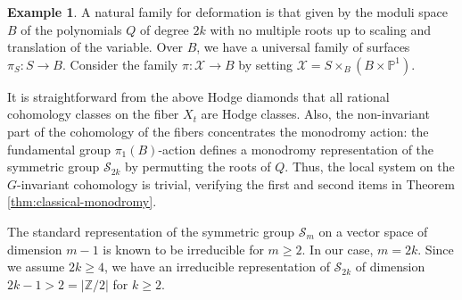 \documentclass[12pt,a4paper]{amsart}
\theoremstyle{definition}
\newtheorem{example}[theorem]{Example}
\theoremstyle{remark}
\newcommand{\Z}{\mathbb{Z}}
\begin{document}
\begin{example}
A natural family for deformation is that given by the moduli space $B$ of the polynomials $Q$ of degree $2k$ with no multiple roots up to scaling and translation of the variable. Over $B$, we have a universal family of surfaces $\pi_S: S\to B$. Consider the family $\pi: \mathcal X \to B$ by setting $\mathcal{X} = S \times_B (B \times \mathbb P^1)$.

It is straightforward from the above Hodge diamonds that all rational cohomology classes on the fiber $X_t$ are Hodge classes. Also, the non-invariant part of the cohomology of the fibers concentrates the monodromy action: the fundamental group $\pi_1(B)$-action defines a monodromy representation of the symmetric group $\mathcal S_{2k}$ by permutting the roots of $Q$. Thus, the local system on the $G$-invariant cohomology is trivial, verifying the first and second items in Theorem \ref{thm:classical-monodromy}.

 The standard representation of the symmetric group $\mathcal S_m$ on a vector space of dimension $m-1$ is known to be irreducible for $m \ge 2$. In our case, $m=2k$. Since we assume $2k \ge 4$, we have an irreducible representation of $\mathcal S_{2k}$ of dimension $2k-1>2=|\mathbb Z/2|$ for $k\geq 2$.


\end{example}


\ 
\end{document}
